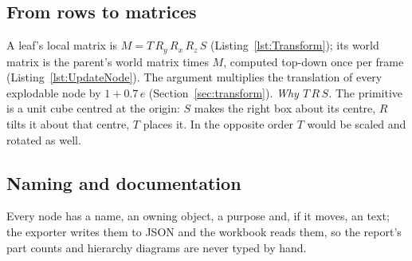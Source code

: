 \subsection{From rows to matrices}
A leaf's local matrix is $M=T\,R_y\,R_x\,R_z\,S$ (Listing~\ref{lst:Transform}); its world matrix is the parent's world matrix times $M$, computed top-down once per frame (Listing~\ref{lst:UpdateNode}). The  argument
multiplies the translation of every explodable node by $1+0.7\,e$ (Section~\ref{sec:transform}).
\lstTransform
\lstUpdateNode
\emph{Why $T\,R\,S$.} The primitive is a unit cube centred at the origin: $S$ makes the right box about its centre, $R$ tilts it about that centre, $T$ places it. In the
opposite order $T$ would be scaled and rotated as well.

\subsection{Naming and documentation}
Every node has a name, an owning object, a purpose and, if it moves, an  text; the exporter writes them to JSON and the workbook reads them, so the report's part counts and hierarchy diagrams are never typed by hand.
